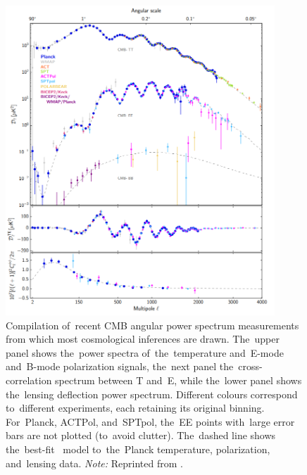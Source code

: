 \begin{figure}[!hbt]
    \centering
    \includegraphics[width=0.9\textwidth]{cosmo_evol/CMB_compilation.png}
    \caption{Compilation of~recent CMB angular power spectrum measurements from which most cosmological inferences are drawn. The~upper panel shows the~power spectra of~the~temperature and~E-mode and~B-mode polarization signals, the~next panel the~cross-correlation spectrum between T and~E, while the~lower panel shows the~lensing deflection power spectrum. Different colours correspond to~different experiments, each retaining its original binning. For~Planck, ACTPol, and~SPTpol, the~EE points with~large error bars are not plotted (to~avoid clutter). The~dashed line shows the~best-fit \LCDM\ model to~the~Planck temperature, polarization, and~lensing data. \textit{Note:} Reprinted from \textcite{2018arXiv180706205P}.}
    \label{fig:cmb_compilation}
\end{figure}
